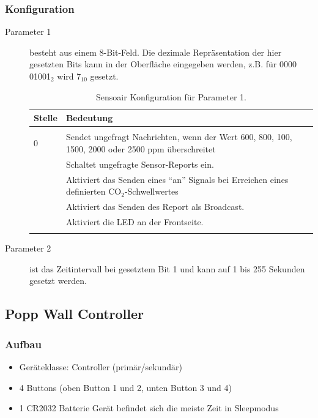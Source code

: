 \subsubsection{Konfiguration}
\begin{description}
	\item [Parameter 1] besteht aus einem 8-Bit-Feld. Die dezimale Repräsentation der hier gesetzten Bits kann in der Oberfläche eingegeben werden, z.B. für 0000 01001$_2$ wird 7$_{10}$ gesetzt.
	\begin{longtabu} to 
		\hline
		\textbf{Stelle}		& \textbf{Bedeutung} \\
		\hline
		\endhead
		  \\ 
		\endfoot
		\endlastfoot
		0					& Sendet ungefragt Nachrichten, wenn der Wert 600, 800, 100, 1500, 2000 oder 2500 \gls{ppm} überschreitet\\ 
							& Schaltet ungefragte Sensor-Reports ein.
		\\
							& Aktiviert das Senden eines "`an"' Signals bei Erreichen eines definierten CO$_2$-Schwellwertes \\
							& Aktiviert das Senden des Report als Broadcast. \\
							& Aktiviert die LED an der Frontseite. \\
		\hline
		\caption{Sensoair Konfiguration für Parameter 1.}
	\end{longtabu}
	\item [Parameter 2] ist das Zeitintervall bei gesetztem Bit 1 und kann auf 1 bis 255 Sekunden gesetzt werden.
\end{description}


\subsection{Popp Wall Controller}
\subsubsection{Aufbau}
\begin{itemize}
	\item Geräteklasse: Controller (primär/sekundär)
	\item 4 Buttons (oben Button 1 und 2, unten Button 3 und 4)
	\item 1 CR2032 Batterie \textrightarrow{ }Gerät befindet sich die meiste Zeit in Sleepmodus
\end{itemize}

